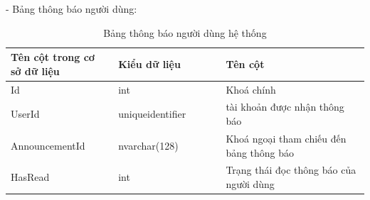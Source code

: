 - Bảng thông báo người dùng:
\begin{longtable}[htp]{ |m{0.3\linewidth}|m{0.3\linewidth}|m{0.4\linewidth}|}
 \caption{Bảng thông báo người dùng hệ thống \label{database}}\\
 \hline
 Tên cột trong cơ sở dữ liệu & Kiểu dữ liệu & Tên cột  \\
 \hline
  Id&int&Khoá chính\\
 \hline
  UserId&uniqueidentifier&tài khoản được nhận thông báo\\
 \hline
  AnnouncementId&nvarchar(128)&Khoá ngoại tham chiếu đến bảng thông báo\\
 \hline
  HasRead&int&Trạng thái đọc thông báo của người dùng \\
 \hline
\end{longtable}

